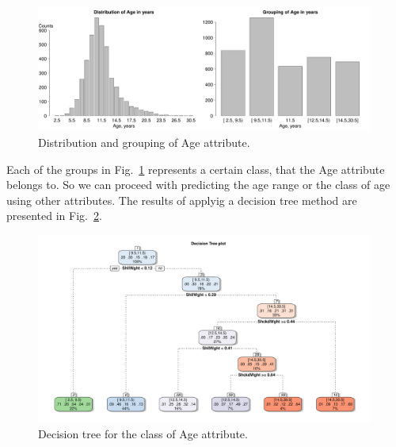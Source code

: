 \documentclass[10pt, paper=a4]{article}
\begin{document}
\begin{figure}[htbp]
  \centering
  \includegraphics[width = 0.99\textwidth]{age_grouping.pdf}
  \caption{Distribution and grouping of Age attribute.}
  \label{fig:age_grouping}
\end{figure}

Each of the groups in Fig.~\ref{fig:age_grouping} represents a certain
class, that the Age attribute belongs to.  So we can proceed with
predicting the age range or the class of age using other attributes.
The results of applyig a decision tree method are presented in
Fig.~\ref{fig:decision_tree}.


\begin{figure}[htbp]
  \centering
  \includegraphics[width = 0.99\textwidth]{decision_tree.pdf}
  \caption{Decision tree for the class of Age attribute.}
  \label{fig:decision_tree}
\end{figure}


\end{document}
